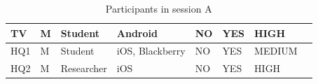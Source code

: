 \begin{table}[H]
{\begin{tabular}{|l|l|l|l|l|l|l|l|}
TV       & M      & Student    & Android                                                         & NO                                                                 & YES                                                                  & HIGH                                                         &                         \\ \hline
HQ1      & M      & Student    & iOS, Blackberry                                                 & NO                                                                 & YES                                                                  & MEDIUM                                                       &                         \\ \hline
HQ2      & M      & Researcher & iOS                                                             & NO                                                                 & YES                                                                  & HIGH                                                         &                         \\ \hline
\end{tabular}}
\caption{Participants in session A}
\end{table}



